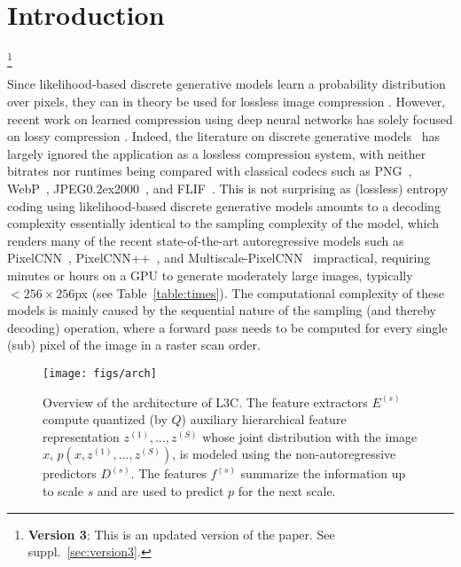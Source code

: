 \documentclass[10pt,twocolumn,letterpaper]{article}
\newcommand\blfootnote[1]{\begingroup
  \renewcommand\thefootnote{}\footnote{#1}\addtocounter{footnote}{-1}\endgroup
}
\newcommand{\name}{L3C\xspace}
\newcommand{\jpegk}{JPEG\kern0.2ex2000\xspace}
\begin{document}
\section{Introduction}
\blfootnote{\textbf{Version 3}: This is an updated version of the paper. See suppl.~\ref{sec:version3}.}
Since likelihood-based discrete generative models learn a probability distribution over pixels, they can in theory be used for lossless image compression \cite{theis2016note}. However, recent work on learned compression using deep neural networks has solely focused on lossy compression \cite{balle2016end, theis2017lossy, toderici2016full, rippel17a, agustsson2017soft,agustsson2018generative,tschannen2018lossy}. Indeed, the literature on discrete generative models~\cite{van2016pixel, van2016conditional, Salimans2017pcnnpp, reed2017parallel, kolesnikov2017pixelcnn} has largely ignored the application as a lossless compression system, with neither bitrates nor runtimes being compared with classical codecs such as PNG~\cite{pngurl}, WebP~\cite{webpurl}, \jpegk~\cite{skodras2001jpeg2000}, and FLIF~\cite{flif2016}.
This is not surprising as (lossless) entropy coding using likelihood-based discrete generative models amounts to a decoding complexity essentially identical to the sampling complexity of the model, which renders many of the recent state-of-the-art autoregressive models such as PixelCNN~\cite{van2016pixel}, PixelCNN++~\cite{Salimans2017pcnnpp}, and Multiscale-PixelCNN~\cite{reed2017parallel} impractical, requiring minutes or hours on a GPU to generate moderately large images, typically ${<}256 \times 256$px (see Table~\ref{table:times}). 
The computational complexity of these models is mainly caused by the sequential nature of the sampling (and thereby decoding) operation, where a forward pass needs to be computed for every single (sub) pixel of the image in a raster scan order.

\begin{figure}[t!]
\centering
\texttt{[image: figs/arch]}
    \caption{\label{fig:arch}Overview of the architecture of \name. The feature extractors $E^{(s)}$ compute quantized (by $Q$) auxiliary hierarchical feature representation $z^{(1)}, \ldots, z^{(S)}$ whose joint distribution with the image $x$, $p(x,z^{(1)}, \ldots, z^{(S)})$, is modeled using the non-autoregressive predictors $D^{(s)}$. The features $f^{(s)}$ summarize the information up to scale $s$ and are used to predict $p$ for the next scale.}
\end{figure}
\end{document}
